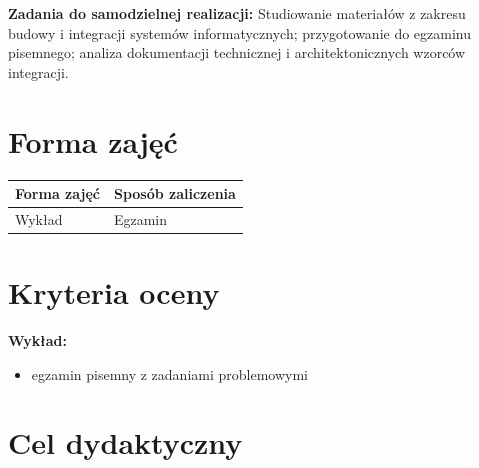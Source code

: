 \documentclass[12pt, a4paper]{article}
\newcommand{\thdrule}{\noalign{\global\setlength{\extrarowheight}{0pt}}}
\newcommand{\thdend}{\noalign{\global\setlength{\extrarowheight}{3pt}}}
\begin{document}
\vspace{4pt}
\noindent\textbf{Zadania do samodzielnej realizacji:} Studiowanie materiałów z zakresu budowy i integracji systemów informatycznych; przygotowanie do egzaminu pisemnego; analiza dokumentacji technicznej i architektonicznych wzorców integracji.

\section{Forma zajęć}

\begin{center}
{\scriptsize
\begin{tabular}{m{5cm}m{8cm}}
\thdrule\toprule
\rowcolor{pjatkRed} {\color{white}\textbf{Forma zajęć}} & {\color{white}\textbf{Sposób zaliczenia}} \\
\midrule\thdend
  \rowcolor{tableRowLight} Wykład & Egzamin \\
\bottomrule
\end{tabular}}
\end{center}

\section{Kryteria oceny}

\textbf{Wykład:}
\begin{itemize}
  \item egzamin pisemny z zadaniami problemowymi
\end{itemize}
\vspace{4pt}


\section{Cel dydaktyczny}
\end{document}
